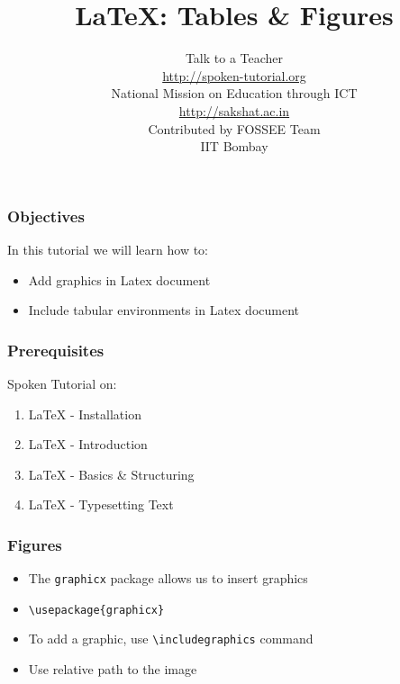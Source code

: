 \documentclass[17pt,compress]{beamer}
\author[FOSSEE]{}
\institute[IIT Bombay]{}
\date[]{}
\newcommand{\typ}[1]{\lstinline{#1}}
\begin{document}
\sffamily \bfseries
\title
[{\LaTeX}: Tables \& Figures]
{{\LaTeX}: Tables \& Figures}
\author
[FOSSEE]
{\small Talk to a Teacher\\{\color{blue}\url{http://spoken-tutorial.org}}
\\\vspace{0.25cm}National Mission on Education
 through ICT\\{\color{blue}\url{ http://sakshat.ac.in}} \\ [1.65cm]
   Contributed by FOSSEE Team \\IIT Bombay  \\[0.3cm]
}

\begin{frame}
   \titlepage
\end{frame}


\begin{frame}
  \frametitle{Objectives}
  In this tutorial we will learn how to:
  \begin{itemize}
  \item Add graphics in Latex document
  \item Include tabular environments in Latex document
  \end{itemize}
\end{frame}


\begin{frame}
  \frametitle{Prerequisites}
  Spoken Tutorial on:
  \begin{enumerate}
  \item {\LaTeX} - Installation
  \item {\LaTeX} - Introduction
  \item {\LaTeX} - Basics \& Structuring
  \item {\LaTeX} - Typesetting Text
  \end{enumerate}
\end{frame}

\begin{frame}[fragile]
  \frametitle{Figures}
  \begin{itemize}
  \item The \typ{graphicx} package allows us to insert graphics
  \item \lstinline+\usepackage{graphicx}+
  \item To add a graphic, use \lstinline{\includegraphics} command
  \item Use relative path to the image
  \end{itemize}
\end{frame}
\end{document}
